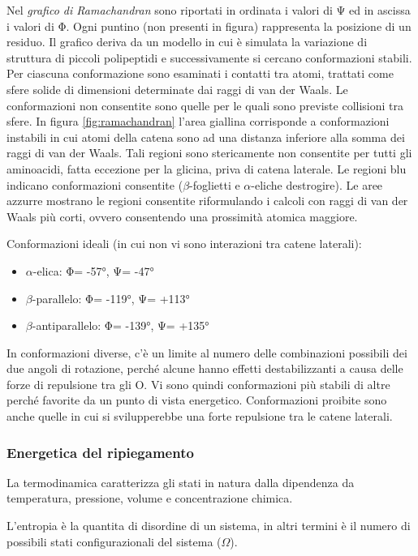 {{{Nel \textit{grafico di Ramachandran} sono riportati in ordinata i valori di Ψ ed in ascissa i valori di Φ. Ogni puntino (non presenti in figura) rappresenta la posizione di un residuo. Il grafico deriva da un modello in cui è simulata la variazione di struttura di piccoli polipeptidi e successivamente si cercano conformazioni stabili. Per ciascuna conformazione sono esaminati i contatti tra atomi, trattati come sfere solide di dimensioni determinate dai raggi di van der Waals. Le conformazioni non consentite sono quelle per le quali sono previste collisioni tra sfere. In figura \ref{fig:ramachandran} l'area giallina corrisponde a conformazioni instabili in cui atomi della catena sono ad una distanza inferiore alla somma dei raggi di van der Waals. Tali regioni sono stericamente non consentite per tutti gli aminoacidi, fatta eccezione per la glicina, priva di catena laterale. Le regioni blu indicano conformazioni consentite ($\beta$-foglietti e $\alpha$-eliche destrogire). Le aree azzurre mostrano le regioni consentite riformulando i calcoli con raggi di van der Waals più corti, ovvero consentendo una prossimità atomica maggiore.

\par Conformazioni ideali (in cui non vi sono interazioni tra catene laterali):
\begin{itemize}
	\item $\alpha$-elica: Φ= -57°, Ψ= -47°
	\item $\beta$-parallelo: Φ= -119°, Ψ= +113°
	\item $\beta$-antiparallelo: Φ= -139°, Ψ= +135°
\end{itemize}

\par In conformazioni diverse, c’è un limite al numero delle combinazioni
possibili dei due angoli di rotazione, perché alcune hanno effetti
destabilizzanti a causa delle forze di repulsione tra gli O. Vi sono quindi conformazioni più stabili di altre perché favorite da un
punto di vista energetico. Conformazioni proibite sono anche quelle in cui si svilupperebbe una forte repulsione tra le catene laterali.
}

\subsubsection{Energetica del ripiegamento}
La termodinamica caratterizza gli stati in natura dalla dipendenza da temperatura, pressione, volume e concentrazione chimica. 

\par L'entropia è la quantita di disordine di un sistema, in altri termini è il numero di possibili stati configurazionali del sistema ($\Omega$). 

}}

